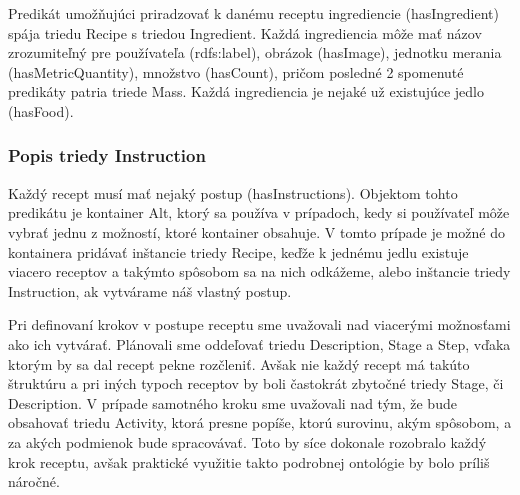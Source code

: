 	Predikát umožňujúci priradzovať k danému receptu ingrediencie (hasIngredient) spája triedu Recipe s triedou Ingredient. Každá ingrediencia môže mať názov zrozumiteľný pre používateľa (rdfs:label), obrázok (hasImage), jednotku merania (hasMetricQuantity), množstvo (hasCount), pričom posledné 2 spomenuté predikáty patria triede Mass. Každá ingrediencia je nejaké už existujúce jedlo (hasFood).
	
\subsubsection{Popis triedy Instruction}
	Každý recept musí mať nejaký postup (hasInstructions). Objektom tohto predikátu je kontainer Alt, ktorý sa používa v prípadoch, kedy si používateľ môže vybrať jednu z možností, ktoré kontainer obsahuje. V tomto prípade je možné do kontainera pridávať inštancie triedy Recipe, keďže k jednému jedlu existuje viacero receptov a takýmto spôsobom sa na nich odkážeme, alebo inštancie triedy Instruction, ak vytvárame náš vlastný postup. 
	
	Pri definovaní krokov v postupe receptu sme uvažovali nad viacerými možnosťami ako ich vytvárať. Plánovali sme oddeľovať triedu Description, Stage a Step, vďaka ktorým by sa dal recept pekne rozčleniť. Avšak nie každý recept má takúto štruktúru a pri iných typoch receptov by boli častokrát zbytočné triedy Stage, či Description. V prípade samotného kroku sme uvažovali nad tým, že bude obsahovať triedu Activity, ktorá presne popíše, ktorú surovinu, akým spôsobom, a za akých podmienok bude spracovávať. Toto by síce dokonale rozobralo každý krok receptu, avšak praktické využitie takto podrobnej ontológie by bolo príliš náročné. 
	
